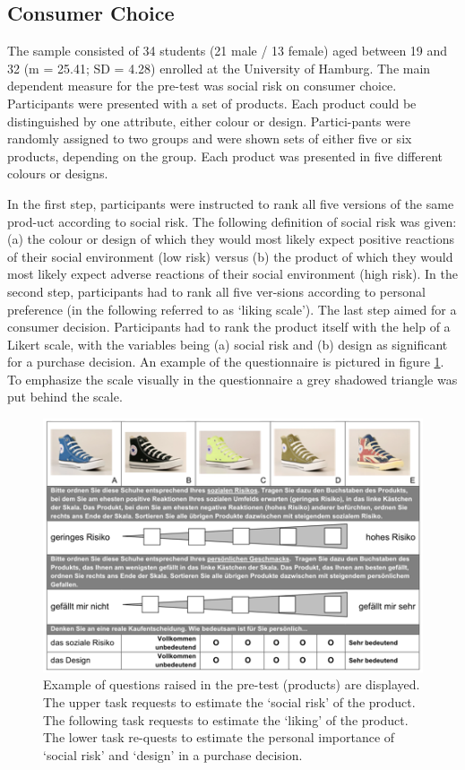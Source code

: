 \subsection{Consumer Choice}\label{sec:consumerchoice}
The sample consisted of 34 students (21 male / 13 female) aged between 19 and 32 (m = 25.41; SD = 4.28) enrolled at the University of Hamburg. The main dependent measure for the pre-test was social risk on consumer choice. Participants were presented with a set of products. Each product could be distinguished by one attribute, either colour or design. Partici-pants were randomly assigned to two groups and were shown sets of either five or six products, depending on the group. Each product was presented in five different colours or designs. \par
In the first step, participants were instructed to rank all five versions of the same prod-uct according to social risk. The following definition of social risk was given: (a) the colour or design of which they would most likely expect positive reactions of their social environment (low risk) versus (b) the product of which they would most likely expect adverse reactions of their social environment (high risk). In the second step, participants had to rank all five ver-sions according to personal preference (in the following referred to as ‘liking scale’). The last step aimed for a consumer decision. Participants had to rank the product itself with the help of a Likert scale, with the variables being (a) social risk and (b) design as significant for a purchase decision. An example of the questionnaire is pictured in figure \ref{fig:pretest_sample_shoes}. To emphasize the scale visually in the questionnaire a grey shadowed triangle was put behind the scale.\par
\begin{figure}[h!]
\center
	\includegraphics[width=1\textwidth]{images/pretest_sample_shoes.png}
  \caption{Example of questions raised in the pre-test (products) are displayed. The upper task requests to estimate the ‘social risk’ of the product. The following task requests to estimate the ‘liking’ of the product. The lower task re-quests to estimate the personal importance of ‘social risk’ and ‘design’ in a purchase decision.}\label{fig:pretest_sample_shoes}
\end{figure}
